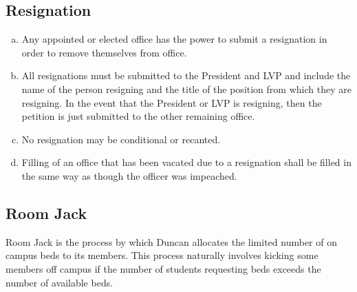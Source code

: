 \documentclass[USletter,12pt]{article}
\begin{document}
\begin{enumerate}[(a)]
\subsection{Resignation}


\begin{enumerate}[(a)]
\item Any appointed or elected office has the power to submit a resignation in order to remove themselves from office.
\item All resignations must be submitted to the President and LVP and include the name of the person resigning and the title of the position from which they are resigning.  In the event that the President or LVP is resigning, then the petition is just submitted to the other remaining office.
\item No resignation may be conditional or recanted.
\item Filling of an office that has been vacated due to a resignation shall be filled in the same way as though the officer was impeached.
\end{enumerate}


\subsection{Room Jack}

Room Jack is the process by which Duncan allocates the limited number of on campus beds to its members.  This process naturally involves kicking some members off campus if the number of students requesting beds exceeds the number of available beds.


\end{enumerate}
\end{document}

